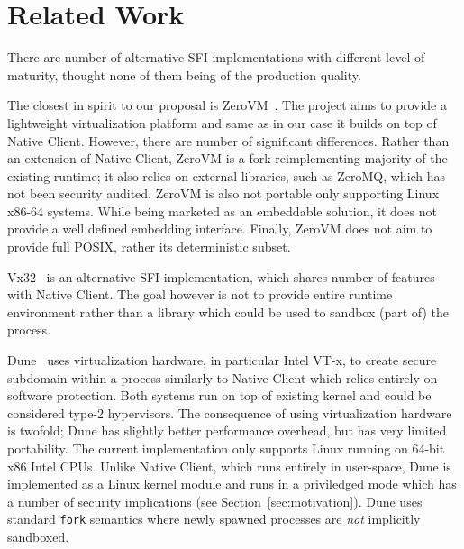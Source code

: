 \section{Related Work}
\label{sec:related}

There are number of alternative SFI implementations with different level
of maturity, thought none of them being of the production quality.

The closest in spirit to our proposal is ZeroVM~\cite{zerovm}. The
project aims to provide a lightweight virtualization platform and same
as in our case it builds on top of Native Client.  However, there are
number of significant differences. Rather than an extension of Native
Client, ZeroVM is a fork reimplementing majority of the existing
runtime; it also relies on external libraries, such as \mbox{ZeroMQ},
which has not been security audited. ZeroVM is also not portable only
supporting Linux x86-64 systems. While being marketed as an embeddable
solution, it does not provide a well defined embedding interface.
Finally, ZeroVM does not aim to provide full POSIX, rather its
deterministic subset.

Vx32~\cite{ford:usenix-atc08} is an alternative SFI implementation,
which shares number of features with Native Client. The goal however is
not to provide entire runtime environment rather than a library which
could be used to sandbox (part of) the process.

Dune~\cite{belay:osdi12} uses virtualization hardware, in particular
Intel VT-x, to create secure subdomain within a process similarly to
Native Client which relies entirely on software protection. Both systems
run on top of existing kernel and could be considered type-2
hypervisors. The consequence of using virtualization hardware is
twofold; Dune has slightly better performance overhead, but has very
limited portability. The current implementation only supports Linux
running on 64-bit x86 Intel CPUs. Unlike Native Client, which runs
entirely in user-space, Dune is implemented as a Linux kernel module and
runs in a priviledged mode which has a number of security implications
(see Section~\ref{sec:motivation}). Dune uses standard \lstinline`fork`
semantics where newly spawned processes are \emph{not} implicitly
sandboxed.


